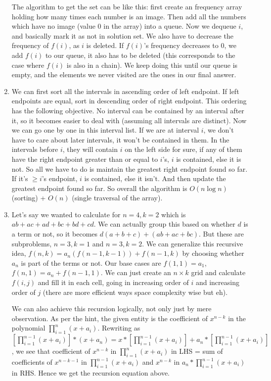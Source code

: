 \documentclass[12pt]{report}
\begin{document}
\begin{enumerate}[label=\textbf{\arabic*.}]
  The algorithm to get the set can be like this: first create an frequency array holding how many times each number is an 
  image. Then add all the numbers which have no image (value 0 in the array) into a queue. Now we dequeue $i$, and basically
  mark it as not in solution set. We also have to decrease the frequency of $f(i)$, as $i$ is deleted. If $f(i)$'s frequency 
  decreases to 0, we add $f(i)$ to our queue, it also has to be deleted (this corresponds to the case where $f(i)$ is also in 
  a chain). We keep doing this until our queue is empty, and the elements we never visited are the ones in our final answer.

  \item We can first sort all the intervals in ascending order of left endpoint. If left endpoints are equal, sort in 
  descending order of right endpoint. This ordering has the following objective. No interval can be contained by an interval
  after it, so it becomes easier to deal with (assuming all intervals are distinct). Now we can go one by one in this 
  interval list. If we are at interval $i$, we don't have to care about later intervals, it won't be contained in them.
  In the intervals before $i$, they will contain $i$ on the left side for sure, if any of them have the right endpoint 
  greater than  or equal to $i$'s, $i$ is contained, else it is not. So all we have to do is maintain the greatest right 
  endpoint found so far. If it's $\geq i$'s endpoint, $i$ is contained, else it isn't. And then update the greatest endpoint 
  found so far. So overall the algorithm is $O(n \log n)$ (sorting) + $O(n)$ (single traversal of the array).

  \item Let's say we wanted to calculate for $n = 4, k = 2$ which is $ab + ac + ad + bc + bd + cd$. We can actually group 
  this based on whether $d$ is a term or not, so it becomes $d(a + b + c) + (ab + ac + bc)$. But these are subproblems, $n = 3, k = 1$
  and $n = 3, k = 2$. We can generalize this recursive idea, $f(n, k) = a_n(f(n-1, k-1)) + f(n-1, k)$ by choosing whether 
  $a_n$ is part of the terms or not. Our base cases are $f(1,1) = a_1$, $f(n,1) = a_n + f(n-1,1)$. We can just create an 
  $n \times k$ grid and calculate $f(i,j)$ and fill it in each cell, going in increasing order of $i$ and increasing order 
  of $j$ (there are more efficient ways space complexity wise but eh).

  We can also achieve this recursion logically, not only just by mere observation. As per the hint, the given entity is the coefficient of $x^{n-k}$ in the polynomial $\prod_{i=1}^{n} (x + a_{i})$. Rewriting as $[\prod_{i=1}^{n-1} (x + a_{i})]*(x + a_{n}) = x*[\prod_{i=1}^{n-1} (x + a_{i})] + a_{n}*[\prod_{i=1}^{n-1} (x + a_{i})]$, we see that coefficient of $x^{n-k}$ in $\prod_{i=1}^{n} (x + a_{i})$ in LHS = sum of coefficients of $x^{n-k-1}$ in $\prod_{i=1}^{n-1} (x + a_{i})$ and $x^{n-k}$ in $a_{n}*\prod_{i=1}^{n-1} (x + a_{i})$ in RHS. Hence we get the recursion equation above.


\end{enumerate}
\end{document}
